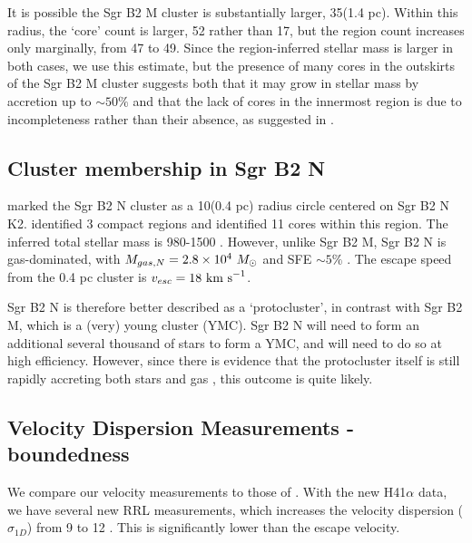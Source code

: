 \documentclass[twocolumn]{aastex61}
\begin{document}

It is possible the Sgr B2 M cluster is substantially larger, 35\arcsec (1.4 pc).
Within this radius, the `core' count is larger, 52 rather than 17, but the \hii
region count increases only marginally, from 47 to 49.  Since the \hii region-inferred
stellar mass is larger in both cases, we use this estimate, but the presence
of many cores in the outskirts of the Sgr B2 M cluster suggests both that it may
grow in stellar mass by accretion up to $\sim50\%$ and that the lack of cores in the
innermost region is due to incompleteness rather than their absence, as suggested
in \citet{Ginsburg2018a}.

\subsection{Cluster membership in Sgr B2 N}
\citet{Schmiedeke2016a} marked the Sgr B2 N cluster as a 10\arcsec  (0.4 pc) radius circle
centered on Sgr B2 N K2.  \citet{Schmiedeke2016a} identified 3 compact \hii regions
and \citet{Ginsburg2018a} identified 11 cores within this region.  The inferred
total stellar mass is 980-1500 \msun.  However, unlike Sgr B2 M, Sgr B2 N
is gas-dominated, with $M_{gas,N} = 2.8\times10^{4}~M_{\odot}$ and SFE $\sim5\%$ \citep{Schmiedeke2016a}.
The escape speed from the 0.4 pc cluster is $v_{esc} = 18~\textrm{km~s}^{-1}$.

Sgr B2 N is therefore better described as a `protocluster', in contrast with
Sgr B2 M, which is a (very) young cluster (YMC).  Sgr B2 N will need to form an
additional several thousand \msun of stars to form a YMC, and will need to do
so at high efficiency.  However, since there is evidence that the protocluster
itself is still rapidly accreting both stars and gas \citep[][cite myself?]{},
this outcome is quite likely.


\subsection{Velocity Dispersion Measurements - boundedness}

We compare our velocity measurements to those of \citet{De-Pree2011a}.
With the new H41$\alpha$ data, we have several new RRL measurements, which increases the velocity dispersion ($\sigma_{1D}$)
from 9 \kms to 12 \kms.  This is significantly lower than the escape velocity.
\end{document}
